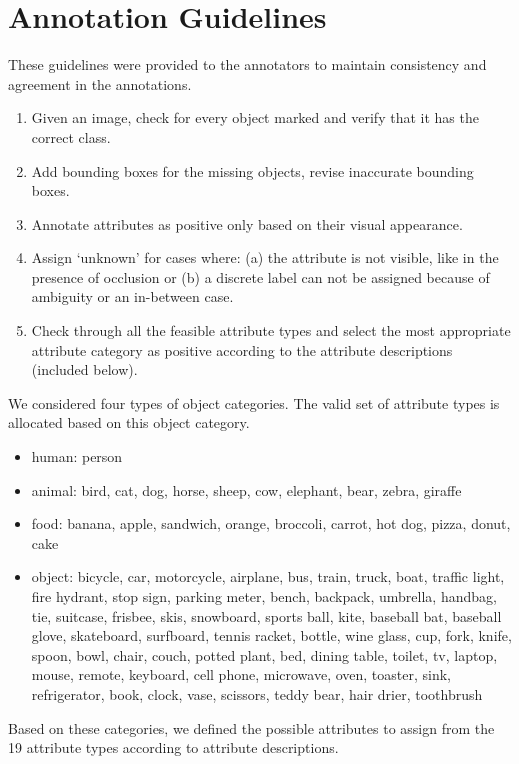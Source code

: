 \documentclass[10pt,twocolumn,letterpaper]{article}
\begin{document}
\section{Annotation Guidelines}
These guidelines were provided to the annotators to maintain consistency and agreement in the annotations. \begin{enumerate}\item Given an image, check for every object marked and verify that it has the correct class.
    \item Add bounding boxes for the missing objects, revise inaccurate bounding boxes. \item Annotate attributes as positive only based on their visual appearance. 
\item  Assign `unknown' for cases where: (a) the attribute is not visible, like in the presence of occlusion or (b) a discrete label can not be assigned because of ambiguity or an in-between case.
    \item Check through all the feasible attribute types and select the most appropriate attribute category as positive according to the attribute descriptions (included below).
\end{enumerate}




We considered four types of object categories. The valid set of attribute types is allocated based on this object category.   \\ 
\begin{itemize}\item human: person
    \item animal: bird,  cat,  dog,  horse,  sheep,  cow,  elephant,  bear,  zebra,  giraffe
    \item food: banana, apple, sandwich, orange, broccoli, carrot, hot dog, pizza, donut, cake
    \item object: bicycle, car, motorcycle, airplane, bus, train, truck, boat, traffic light, fire hydrant, stop sign, parking meter, bench, backpack, umbrella, handbag, tie, suitcase, frisbee, skis, snowboard, sports ball, kite, baseball bat, baseball glove, skateboard, surfboard, tennis racket, bottle, wine glass, cup, fork, knife, spoon, bowl, chair, couch, potted plant, bed, dining table, toilet, tv, laptop, mouse, remote, keyboard, cell phone, microwave, oven, toaster, sink, refrigerator, book, clock, vase, scissors, teddy bear, hair drier, toothbrush
\end{itemize}
Based on these categories, we defined the possible attributes to assign from the 19 attribute types according to attribute descriptions. \\
\end{document}
